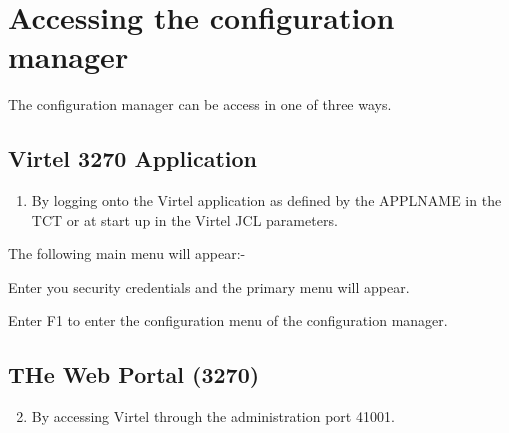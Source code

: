 \documentclass[letterpaper,10pt,english]{sphinxmanual}
\begin{document}
\section{Accessing the configuration manager}
\label{\detokenize{connectivity_guide:accessing-the-configuration-manager}}
The configuration manager can be access in one of three ways.


\subsection{Virtel 3270 Application}
\label{\detokenize{connectivity_guide:virtel-3270-application}}\begin{enumerate}
\item {} 
By logging onto the Virtel application as defined by the APPLNAME in the TCT or at start up in the Virtel JCL parameters.

\end{enumerate}

\begin{sphinxVerbatim}[commandchars=\\\{\}]
 
\end{sphinxVerbatim}

The following main menu will appear:-


Enter you security credentials and the primary menu will appear.


Enter F1 to enter the configuration menu of the configuration manager.


\newpage


\subsection{THe Web Portal (3270)}
\label{\detokenize{connectivity_guide:the-web-portal-3270}}\begin{enumerate}
\setcounter{enumi}{1}
\item {} 
By accessing Virtel through the administration port 41001.

\end{enumerate}

\begin{sphinxVerbatim}[commandchars=\\\{\}]
\end{sphinxVerbatim}
\end{document}
